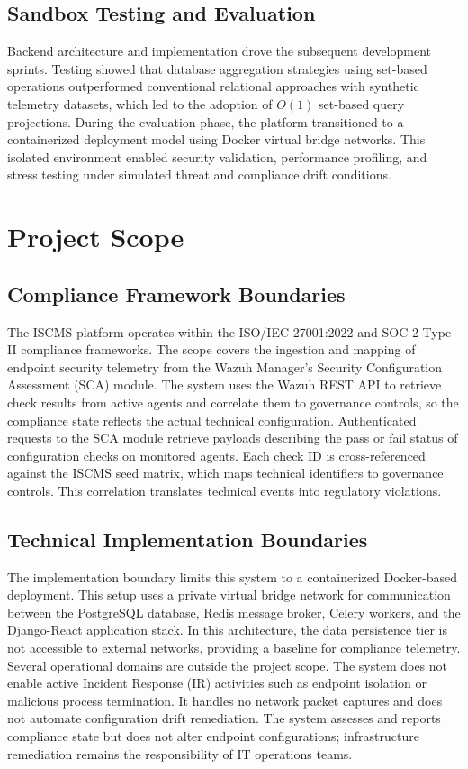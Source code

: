 \subsection{Sandbox Testing and Evaluation}
Backend architecture and implementation drove the subsequent development sprints. Testing showed that database aggregation strategies using set-based operations outperformed conventional relational approaches with synthetic telemetry datasets, which led to the adoption of $O(1)$ set-based query projections. During the evaluation phase, the platform transitioned to a containerized deployment model using Docker virtual bridge networks. This isolated environment enabled security validation, performance profiling, and stress testing under simulated threat and compliance drift conditions.

\section{Project Scope}

\subsection{Compliance Framework Boundaries}
The ISCMS platform operates within the ISO/IEC 27001:2022 and SOC 2 Type II compliance frameworks. The scope covers the ingestion and mapping of endpoint security telemetry from the Wazuh Manager's Security Configuration Assessment (SCA) module. The system uses the Wazuh REST API to retrieve check results from active agents and correlate them to governance controls, so the compliance state reflects the actual technical configuration. Authenticated requests to the SCA module retrieve payloads describing the pass or fail status of configuration checks on monitored agents. Each check ID is cross-referenced against the ISCMS seed matrix, which maps technical identifiers to governance controls. This correlation translates technical events into regulatory violations.

\subsection{Technical Implementation Boundaries}
The implementation boundary limits this system to a containerized Docker-based deployment. This setup uses a private virtual bridge network for communication between the PostgreSQL database, Redis message broker, Celery workers, and the Django-React application stack. In this architecture, the data persistence tier is not accessible to external networks, providing a baseline for compliance telemetry. Several operational domains are outside the project scope. The system does not enable active Incident Response (IR) activities such as endpoint isolation or malicious process termination. It handles no network packet captures and does not automate configuration drift remediation. The system assesses and reports compliance state but does not alter endpoint configurations; infrastructure remediation remains the responsibility of IT operations teams.

